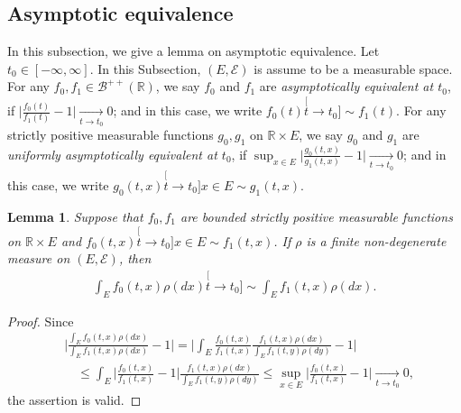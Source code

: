 \documentclass[12pt,a4paper]{amsart}
\newtheorem{lem}[thm]{Lemma}
\theoremstyle{definition}
\numberwithin{equation}{section}
\begin{document}
\subsection{Asymptotic equivalence} 
\label{sec: Asymptotic equivalence}
In this subsection, we give a lemma on asymptotic equivalence.	
Let $t_0 \in [-\infty,\infty]$.
In this Subsection, $(E, \mathscr E)$ is assume to be a  measurable space.
For any $f_0, f_1\in \mathscr B^{++}({\mathbb R})$, we say $f_0$ and $f_1$ are \emph{asymptotically equivalent at $t_0$}, if $\big|\frac{f_0(t)}{f_1(t)} - 1\big| \xrightarrow[t\to t_0]{} 0$;
and in this case, we write $f_0(t) \stackrel[t\to t_0]{}{\sim} f_1(t)$.
For any strictly positive measurable functions $g_0, g_1$ on $\mathbb R\times E$, we say $g_0$ and $g_1$ are \emph{uniformly asymptotically equivalent at $t_0$}, if $\sup_{x\in E}\big|\frac{g_0(t,x)}{g_1(t,x)} - 1\big| \xrightarrow[t\to t_0]{} 0$; and in this case, we write $g_0(t,x)\stackrel[t\to t_0]{x\in E}{\sim}g_1(t,x)$.

\begin{lem} \label{lem: asymptotic equivalent of integration}
	Suppose that $f_0,f_1$ are bounded strictly positive measurable functions on $\mathbb R \times E$ and $f_0(t,x)\stackrel[t\to t_0]{x\in E}{\sim}f_1(t,x)$.
  If $\rho$ is a finite non-degenerate measure on $(E, \mathscr E)$, then
  \begin{align}
    \int_E f_0(t,x)\rho(dx)
    \stackrel[t\to t_0]{}{\sim}
    \int_E f_1(t,x)\rho(dx).
  \end{align}
\end{lem}
\begin{proof}
	Since
\begin{align}
	&\Big| \frac{	\int_E f_0(t,x) \rho(dx) }{ 	\int_E f_1(t,x) \rho(dx)  } - 1 \Big|
   = \Big| \int_E \frac{f_0(t,x)}{f_1(t,x)} \frac{f_1(t,x) \rho(dx)}{	\int_E f_1(t,y) \rho(dy)  } - 1\Big|
	\\&\quad \leq \int_E \Big|  \frac{f_0(t,x)}{f_1(t,x)} - 1 \Big| \frac{f_1(t,x) \rho(dx)}{	\int_E f_1(t,y) \rho(dy)  }
	\leq \sup_{x\in E} \Big|  \frac {f_0(t,x)} {f_1(t,x)} - 1 \Big|
	\xrightarrow[t\to t_0]{} 0,
\end{align}
the assertion is valid.
\end{proof}

\end{document}
